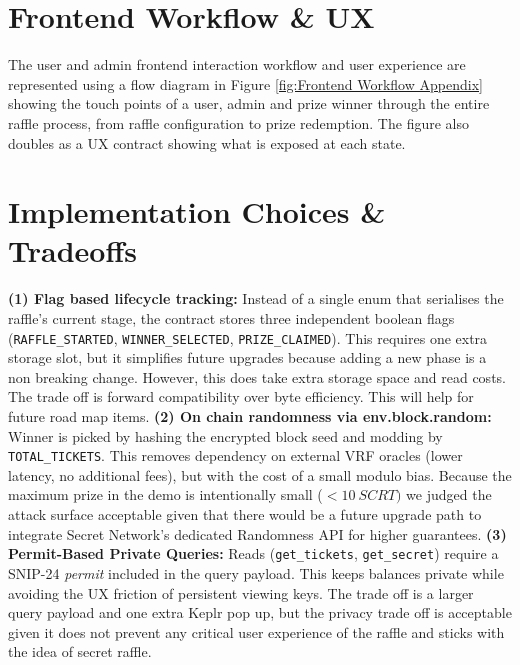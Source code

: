 \documentclass[9pt]{extarticle}
\begin{document}
\section{Frontend Workflow \& UX}
The user and admin frontend interaction workflow and user experience are represented using a flow diagram in Figure \ref{fig:Frontend Workflow Appendix} showing the touch points of a user, admin and prize winner through the entire raffle process, from raffle configuration to prize redemption. The figure also doubles as a UX contract showing what is exposed at each state.

\section{Implementation Choices \& Tradeoffs}

\textbf{(1) Flag based lifecycle tracking:} Instead of a single enum that serialises the raffle's current stage, the contract stores three independent boolean flags (\texttt{RAFFLE\_STARTED}, \texttt{WINNER\_SELECTED}, \texttt{PRIZE\_CLAIMED}). This requires one extra storage slot, but it simplifies future upgrades because adding a new phase is a non breaking change. However, this does take extra storage space and read costs. The trade off is forward compatibility over byte efficiency. This will help for future road map items. \textbf{(2) On chain randomness via env.block.random:} Winner is picked by hashing the encrypted block seed and modding by \texttt{TOTAL\_TICKETS}. This removes dependency on external VRF oracles (lower latency, no additional fees), but with the cost of a small modulo bias. Because the maximum prize in the demo is intentionally small (\(<10~SCRT)\) we judged the attack surface acceptable given that there would be a future upgrade path to integrate Secret Network's dedicated Randomness API for higher guarantees. \textbf{(3) Permit-Based Private Queries:} Reads (\texttt{get\_tickets}, \texttt{get\_secret}) require a SNIP-24 \emph{permit} included in the query payload. This keeps balances private while avoiding the UX friction of persistent viewing keys. The trade off is a larger query payload and one extra Keplr pop up, but the privacy trade off is acceptable given it does not prevent any critical user experience of the raffle and sticks with the idea of secret raffle.
\end{document}
